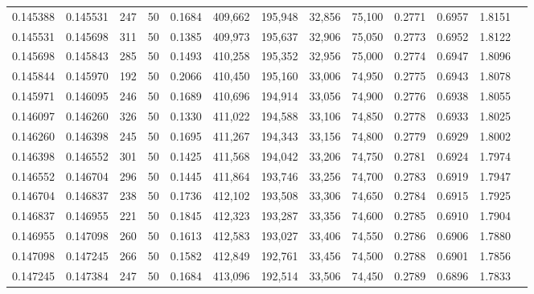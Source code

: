 \begin{tabular}{rrrrrrrrrrrrr}
0.145388 & 0.145531 &   247 &  50 &                                     0.1684 & 409,662 & 195,948 &  32,856 &  75,100 & 0.2771 & 0.6957 & 1.8151 \\
0.145531 & 0.145698 &   311 &  50 &                                     0.1385 & 409,973 & 195,637 &  32,906 &  75,050 & 0.2773 & 0.6952 & 1.8122 \\
0.145698 & 0.145843 &   285 &  50 &                                     0.1493 & 410,258 & 195,352 &  32,956 &  75,000 & 0.2774 & 0.6947 & 1.8096 \\
0.145844 & 0.145970 &   192 &  50 &                                     0.2066 & 410,450 & 195,160 &  33,006 &  74,950 & 0.2775 & 0.6943 & 1.8078 \\
0.145971 & 0.146095 &   246 &  50 &                                     0.1689 & 410,696 & 194,914 &  33,056 &  74,900 & 0.2776 & 0.6938 & 1.8055 \\
0.146097 & 0.146260 &   326 &  50 &                                     0.1330 & 411,022 & 194,588 &  33,106 &  74,850 & 0.2778 & 0.6933 & 1.8025 \\
0.146260 & 0.146398 &   245 &  50 &                                     0.1695 & 411,267 & 194,343 &  33,156 &  74,800 & 0.2779 & 0.6929 & 1.8002 \\
0.146398 & 0.146552 &   301 &  50 &                                     0.1425 & 411,568 & 194,042 &  33,206 &  74,750 & 0.2781 & 0.6924 & 1.7974 \\
0.146552 & 0.146704 &   296 &  50 &                                     0.1445 & 411,864 & 193,746 &  33,256 &  74,700 & 0.2783 & 0.6919 & 1.7947 \\
0.146704 & 0.146837 &   238 &  50 &                                     0.1736 & 412,102 & 193,508 &  33,306 &  74,650 & 0.2784 & 0.6915 & 1.7925 \\
0.146837 & 0.146955 &   221 &  50 &                                     0.1845 & 412,323 & 193,287 &  33,356 &  74,600 & 0.2785 & 0.6910 & 1.7904 \\
0.146955 & 0.147098 &   260 &  50 &                                     0.1613 & 412,583 & 193,027 &  33,406 &  74,550 & 0.2786 & 0.6906 & 1.7880 \\
0.147098 & 0.147245 &   266 &  50 &                                     0.1582 & 412,849 & 192,761 &  33,456 &  74,500 & 0.2788 & 0.6901 & 1.7856 \\
0.147245 & 0.147384 &   247 &  50 &                                     0.1684 & 413,096 & 192,514 &  33,506 &  74,450 & 0.2789 & 0.6896 & 1.7833 \\

\end{tabular}
